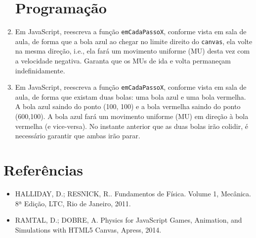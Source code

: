 \documentclass[12pt,a4paper,oneside]{article}
\begin{document}
\begin{enumerate}
\section{Programação}

	\item Em JavaScript, reescreva a função {\tt emCadaPassoX}, conforme vista em sala de aula, de forma que a bola azul ao chegar no limite direito do {\tt canvas}, ela volte na mesma direção, i.e., ela fará um movimento uniforme (MU) desta vez com a velocidade negativa. Garanta que os MUs de ida e volta permaneçam indefinidamente.
	
	\item Em JavaScript, reescreva a função {\tt emCadaPassoX}, conforme vista em sala de aula, de forma que existam duas bolas: uma bola azul e uma bola vermelha. A bola azul saindo do ponto (100, 100) e a bola vermelha saindo do ponto (600,100). A bola azul fará um movimento uniforme (MU) em direção à bola vermelha (e vice-versa). No instante anterior que as duas bolas irão colidir, é necessário garantir que ambas irão parar.
		
\end{enumerate}

\section{Referências}

\begin{itemize}
	\item HALLIDAY, D.; RESNICK, R.. Fundamentos de Física. Volume 1, Mecânica. 8ª Edição, LTC, Rio de Janeiro, 2011.

	\item RAMTAL, D.; DOBRE, A. Physics for JavaScript Games, Animation, and Simulations with HTML5 Canvas, Apress, 2014.
\end{itemize}
\end{document}
